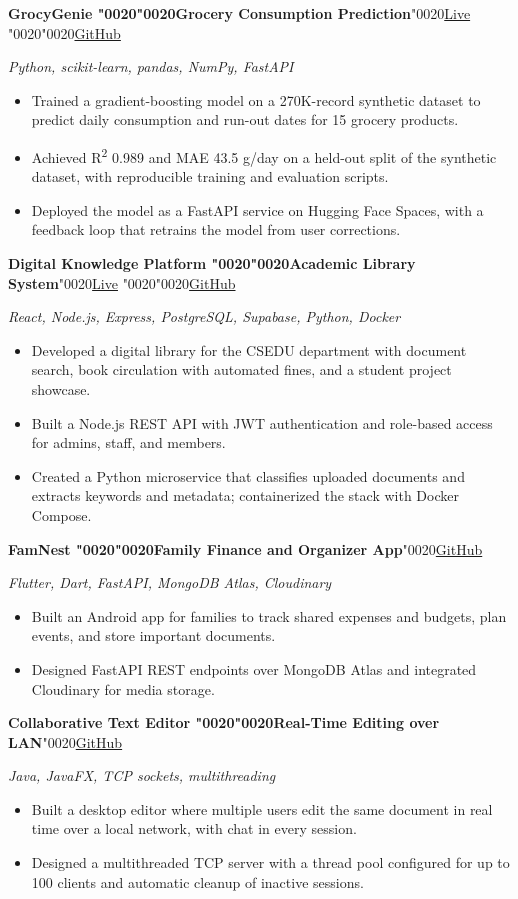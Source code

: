 \documentclass[10pt,a4paper]{article}
\newcommand{\realspace}{\XeTeXglyph\XeTeXcharglyph"0020\relax}
\newcommand{\psep}{\realspace\textbar\realspace}
\newcommand{\projectrow}[2]{\Needspace{4\baselineskip}\textbf{#1}\realspace\hfill #2\par}
\newcommand{\techrow}[1]{\textit{#1}\par\vspace{1pt}}
\begin{document}
\projectrow{GrocyGenie \psep Grocery Consumption Prediction}{\href{https://huggingface.co/spaces/shahriar031/GrocyGenie}{Live} \psep \href{https://github.com/shahriarkabir280/GrocyGenieModel}{GitHub}}
\techrow{Python, scikit-learn, pandas, NumPy, FastAPI}
\begin{itemize}
  \item Trained a gradient-boosting model on a 270K-record synthetic dataset to predict daily consumption and run-out dates for 15 grocery products.
  \item Achieved R\textsuperscript{2} 0.989 and MAE 43.5 g/day on a held-out split of the synthetic dataset, with reproducible training and evaluation scripts.
  \item Deployed the model as a FastAPI service on Hugging Face Spaces, with a feedback loop that retrains the model from user corrections.
\end{itemize}

\projectrow{Digital Knowledge Platform \psep Academic Library System}{\href{https://dkp-frontend-ndrl.onrender.com/}{Live} \psep \href{https://github.com/shahriarkabir280/Digital-Knowledge-Platform}{GitHub}}
\techrow{React, Node.js, Express, PostgreSQL, Supabase, Python, Docker}
\begin{itemize}
  \item Developed a digital library for the CSEDU department with document search, book circulation with automated fines, and a student project showcase.
  \item Built a Node.js REST API with JWT authentication and role-based access for admins, staff, and members.
  \item Created a Python microservice that classifies uploaded documents and extracts keywords and metadata; containerized the stack with Docker Compose.
\end{itemize}

\projectrow{FamNest \psep Family Finance and Organizer App}{\href{https://github.com/shahriarkabir280/FamNest}{GitHub}}
\techrow{Flutter, Dart, FastAPI, MongoDB Atlas, Cloudinary}
\begin{itemize}
  \item Built an Android app for families to track shared expenses and budgets, plan events, and store important documents.
  \item Designed FastAPI REST endpoints over MongoDB Atlas and integrated Cloudinary for media storage.
\end{itemize}

\projectrow{Collaborative Text Editor \psep Real-Time Editing over LAN}{\href{https://github.com/shahriarkabir280/Collaborative-Text-Editor}{GitHub}}
\techrow{Java, JavaFX, TCP sockets, multithreading}
\begin{itemize}
  \item Built a desktop editor where multiple users edit the same document in real time over a local network, with chat in every session.
  \item Designed a multithreaded TCP server with a thread pool configured for up to 100 clients and automatic cleanup of inactive sessions.
\end{itemize}
\end{document}

